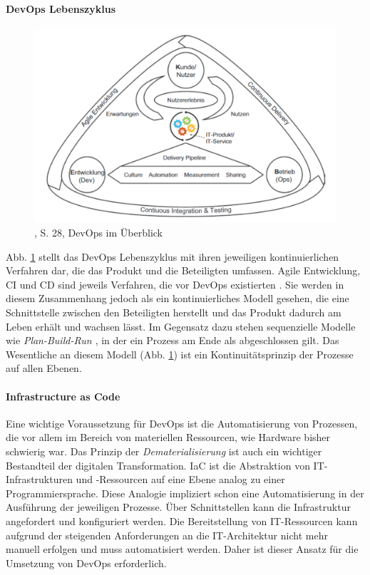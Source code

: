 \paragraph{DevOps Lebenszyklus}
\begin{figure}[htbp]
 \centering
 \includegraphics[width=1.0\textwidth]{gfx/devops_ueberblick.PNG}
 \caption{\citet{Alt2017}, S. 28, DevOps im Überblick\label{fig:devops}}
\end{figure}
\medskip
Abb. \ref{fig:devops} stellt das DevOps Lebenszyklus mit ihren jeweiligen kontinuierlichen Verfahren dar, die das Produkt und die Beteiligten umfassen. Agile Entwicklung, \ac{CI} und \ac{CD} sind jeweils Verfahren, die vor DevOps existierten \cite{Alt2017}. Sie werden in diesem Zusammenhang jedoch als ein kontinuierliches Modell gesehen, die eine Schnittstelle zwischen den Beteiligten herstellt und das Produkt dadurch am Leben erhält und wachsen lässt. Im Gegensatz dazu stehen sequenzielle Modelle wie \emph{Plan-Build-Run \cite{Koch2016}}, in der ein Prozess am Ende als abgeschlossen gilt. Das Wesentliche an diesem Modell (Abb. \ref{fig:devops}) ist ein Kontinuitätsprinzip \cite{Alt2017} der Prozesse auf allen Ebenen.

\paragraph{Infrastructure as Code}
Eine wichtige Voraussetzung für DevOps ist die Automatisierung von Prozessen, die vor allem im Bereich von materiellen Ressourcen, wie Hardware bisher schwierig war. Das Prinzip der \emph{Dematerialisierung} ist auch ein wichtiger Bestandteil der digitalen Transformation.
\ac{IaC} ist die Abstraktion von IT-Infrastrukturen und -Ressourcen auf eine Ebene analog zu einer Programmiersprache. Diese Analogie impliziert schon eine Automatisierung in der Ausführung der jeweiligen Prozesse. Über Schnittstellen kann die Infrastruktur angefordert und konfiguriert werden. Die Bereitstellung von IT-Ressourcen kann aufgrund der steigenden Anforderungen an die IT-Architektur \cite{Brockhoff2006, Bussmann2006, Alt2017} nicht mehr manuell erfolgen und muss automatisiert werden. Daher ist dieser Ansatz für die Umsetzung von DevOps erforderlich.


